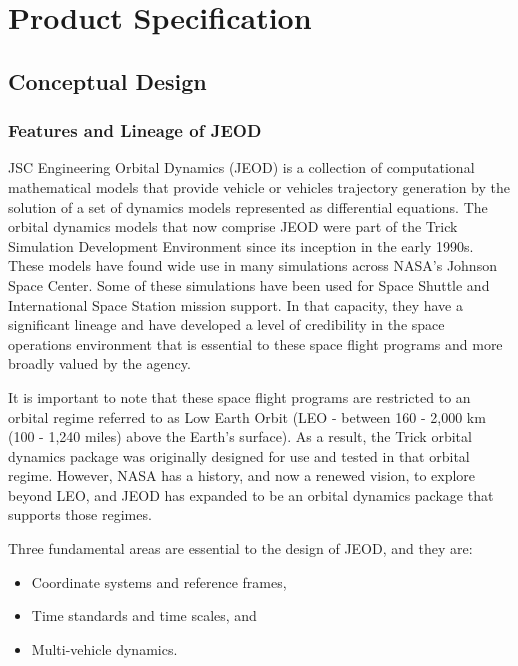%
%
%
%
%

\chapter{Product Specification} \label{ch:spec}
\section{Conceptual Design}
\subsection{Features and Lineage of JEOD}
 JSC Engineering Orbital Dynamics (JEOD) is a collection of computational mathematical models that provide vehicle or vehicles trajectory generation by the solution of a set of dynamics models represented as differential equations.  The orbital dynamics models that now comprise JEOD were part of the Trick Simulation Development Environment since its inception in the early 1990s.  These models have found wide use in many simulations across NASA's Johnson Space Center.  Some of these simulations have been used for Space Shuttle and International Space Station mission support.  In that capacity, they have a significant lineage and have developed a level of credibility in the space operations environment that is essential to these space flight programs and more broadly valued by the agency.

It is important to note that these space flight programs are restricted to an orbital regime referred to as Low Earth Orbit (LEO - between 160 - 2,000 km (100 - 1,240 miles) above the Earth's surface).  As a result, the Trick orbital dynamics package was originally designed for use and tested in that orbital regime.  However, NASA has a history, and now a renewed vision, to explore beyond LEO, and JEOD has expanded to be an orbital dynamics package that supports those regimes.

Three fundamental areas are essential to the design of JEOD, and they are:
\begin{itemize}

\item Coordinate systems and reference frames,

\item Time standards and time scales, and

\item Multi-vehicle dynamics.

\end{itemize}

